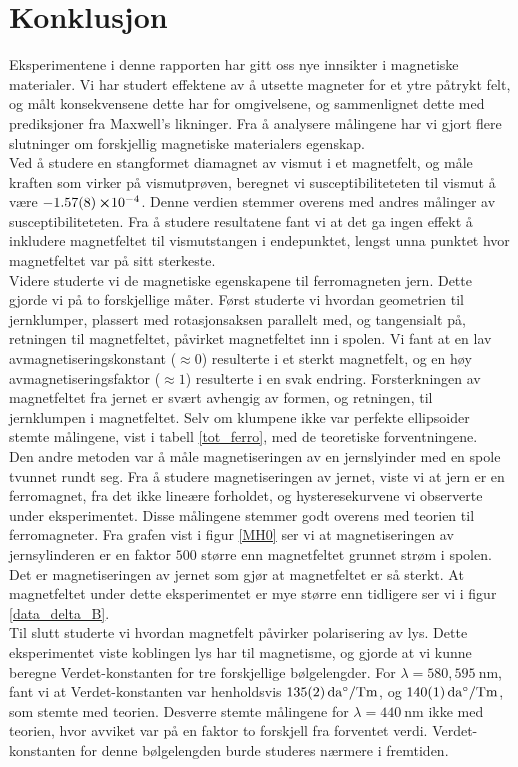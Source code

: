 \documentclass[%
 reprint,
 amsmath,amssymb,
 aps,
 norsk,
]{revtex4-1}
\begin{document}
\section{Konklusjon}
Eksperimentene i denne rapporten har gitt oss nye innsikter i magnetiske materialer. Vi har studert effektene av å utsette magneter for et ytre påtrykt felt, og målt konsekvensene dette har for omgivelsene, og sammenlignet dette med prediksjoner fra Maxwell's likninger. Fra å analysere målingene har vi gjort flere slutninger om forskjellig magnetiske materialers egenskap.\\
Ved å studere en stangformet diamagnet av vismut i et magnetfelt, og måle kraften som virker på vismutprøven, beregnet vi susceptibiliteteten til vismut å være $-\SI{1.57\pm0.08}\cross 10^{-4}$. Denne verdien stemmer overens med andres målinger av susceptibiliteteten. Fra å studere resultatene fant vi at det ga ingen effekt å inkludere magnetfeltet til vismutstangen i endepunktet, lengst unna punktet hvor magnetfeltet var på sitt sterkeste.\\
Videre studerte vi de magnetiske egenskapene til ferromagneten jern. Dette gjorde vi på to forskjellige måter. Først studerte vi hvordan geometrien til jernklumper, plassert med rotasjonsaksen parallelt med, og tangensialt på, retningen til magnetfeltet, påvirket magnetfeltet inn i spolen. Vi fant at en lav avmagnetiseringskonstant ($\approx 0$) resulterte i et sterkt magnetfelt, og en høy avmagnetiseringsfaktor ($\approx 1$) resulterte i en svak endring. Forsterkningen av magnetfeltet fra jernet er svært avhengig av formen, og retningen, til jernklumpen i magnetfeltet. Selv om klumpene ikke var perfekte ellipsoider stemte målingene, vist i tabell \vref{tot_ferro}, med de teoretiske forventningene.\\
Den andre metoden var å måle magnetiseringen av en jernslyinder med en spole tvunnet rundt seg. Fra å studere magnetiseringen av jernet, viste vi at jern er en ferromagnet, fra det ikke lineære forholdet, og hysteresekurvene vi observerte under eksperimentet. Disse målingene stemmer godt overens med teorien til ferromagneter. Fra grafen vist i figur \vref{MH0} ser vi at magnetiseringen av jernsylinderen er en faktor $500$ større enn magnetfeltet grunnet strøm i spolen. Det er magnetiseringen av jernet som gjør at magnetfeltet er så sterkt. At magnetfeltet under dette eksperimentet er mye større enn tidligere ser vi i figur \vref{data_delta_B}. \\
Til slutt studerte vi hvordan magnetfelt påvirker polarisering av lys. Dette eksperimentet viste koblingen lys har til magnetisme, og gjorde at vi kunne beregne Verdet-konstanten for tre forskjellige bølgelengder. For $\lambda = 580, \SI{595}{\nano\meter}$, fant vi at Verdet-konstanten var henholdsvis $\SI{135\pm2}{\deca\degree/\tesla\meter}$, og $\SI{140\pm1}{\deca\degree/\tesla\meter}$, som stemte med teorien. Desverre stemte målingene for $\lambda=\SI{440}{\nano\meter}$ ikke med teorien, hvor avviket var på en faktor to forskjell fra forventet verdi. Verdet-konstanten for denne bølgelengden burde studeres nærmere i fremtiden.
{}

\end{document}
